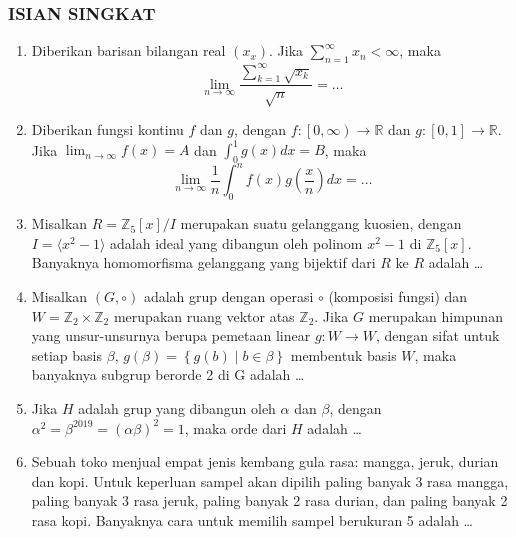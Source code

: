 \documentclass[12pt,twoside]{article}
\begin{document}
\subsubsection*{ISIAN SINGKAT}
\begin{enumerate}
	\item Diberikan barisan bilangan real $\left(x_{x}\right)$. Jika $\displaystyle\sum_{n=1}^\infty x_{n} < \infty$, maka
	      $$\displaystyle\lim_{n\rightarrow\infty} \dfrac{\displaystyle\sum_{k=1}^{\infty} \sqrt{x_k}}{\sqrt{n}}= \dots$$

	\item Diberikan fungsi kontinu $f$ dan $g$, dengan $f : \left[0,\infty\right) \rightarrow \mathbb{R}$ dan $g : \left[0,1\right] \rightarrow \mathbb{R}$. Jika $\displaystyle\lim_{n\rightarrow\infty} f\left(x\right)=A$ dan $\displaystyle\int_{0}^1g\left(x\right)dx=B$, maka
	      $$\displaystyle\lim_{n\rightarrow\infty} \dfrac{1}{n}\int_{0}^{n} f\left(x\right)g\left(\dfrac{x}{n}\right)dx= \dots$$

	\item Misalkan $R = \mathbb{Z}_{5}\left[x\right]/I$ merupakan suatu gelanggang kuosien, dengan $I = \langle x^2-1 \rangle$ adalah  ideal yang dibangun oleh polinom $ x^2-1$ di $\mathbb{Z}_{5}\left[x\right]$. Banyaknya homomorfisma gelanggang yang bijektif dari $R$ ke $R$ adalah \dots

	\item Misalkan $\left(G,\circ \right)$ adalah grup dengan operasi $\circ$ (komposisi fungsi) dan $W=\mathbb{Z}_{2}\times \mathbb{Z}_{2}$ merupakan ruang vektor atas $\mathbb{Z}_{2}$. Jika $G$ merupakan himpunan yang unsur-unsurnya berupa pemetaan linear $g : W \rightarrow W$, dengan sifat untuk setiap basis $\beta$, $g\left(\beta\right) = \left\lbrace g(b) \mid b\in\beta\right\rbrace $ membentuk basis $W$, maka banyaknya subgrup berorde 2 di G adalah \dots

	\item Jika $H$ adalah grup yang dibangun oleh $\alpha$ dan $\beta$, dengan $\alpha^2 = \beta^{2019} = \left(\alpha\beta\right)^2 = 1$, maka orde dari $H$ adalah \dots

	\item Sebuah toko menjual empat jenis kembang gula rasa: mangga, jeruk, durian dan kopi. Untuk keperluan sampel akan dipilih paling banyak 3 rasa mangga, paling banyak 3 rasa jeruk, paling banyak 2 rasa durian, dan paling banyak 2 rasa kopi. Banyaknya cara untuk memilih sampel berukuran 5 adalah \dots
\end{enumerate}
\end{document}
